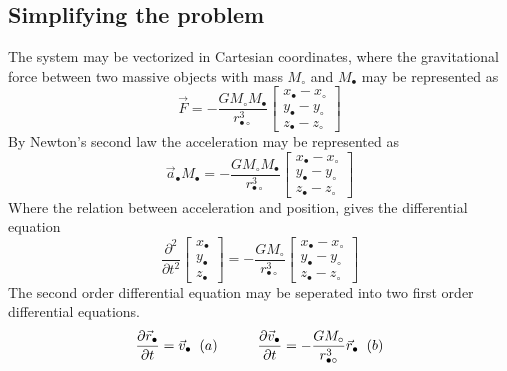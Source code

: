 \documentclass[twoside,twocolumn]{article}
\newcommand{\planet}{\bullet}
\begin{document}
\subsection{Simplifying the problem}
The system may be vectorized in Cartesian coordinates, where the gravitational force between two massive objects with mass $M_\circ$ and $M_\planet$ may be represented as 
\begin{equation}
\vec F=-\frac{GM_\circ M_\planet}{r_{\planet\circ
}^3}\begin{bmatrix}
x_\planet-x_\circ\\
y_\planet-y_\circ\\
z_\planet-z_\circ
\end{bmatrix}
\end{equation}
By Newton's second law the acceleration may be represented as
\begin{equation*}
\vec a_\planet M_\planet=-\frac{GM_\circ M_\planet}{r_{\planet\circ
}^3}\begin{bmatrix}
x_\planet-x_\circ\\
y_\planet-y_\circ\\
z_\planet-z_\circ
\end{bmatrix}
\end{equation*}
Where the relation between acceleration and position, gives the differential equation
\begin{equation*}
\frac{\partial^2}{\partial t^2}\begin{bmatrix}
x_\planet\\
y_\planet\\
z_\planet
\end{bmatrix}
 =-\frac{GM_\circ}{r_{\planet\circ
}^3}\begin{bmatrix}
x_\planet-x_\circ\\
y_\planet-y_\circ\\
z_\planet-z_\circ
\end{bmatrix}
\end{equation*}
The second order differential equation may be seperated into two first order differential equations.
\begin{equation}
\frac{\partial \vec r_\planet}{\partial t} = \vec v_\planet\hspace{0.2cm}(a)\hspace{1cm}
\frac{\partial \vec v_\planet}{\partial t} =-\frac{GM_\circ}{r_{\planet\circ
}^3}\vec r_\planet\hspace{0.2cm}(b)\label{eq:sep_diff_cont}
\end{equation}
\end{document}
